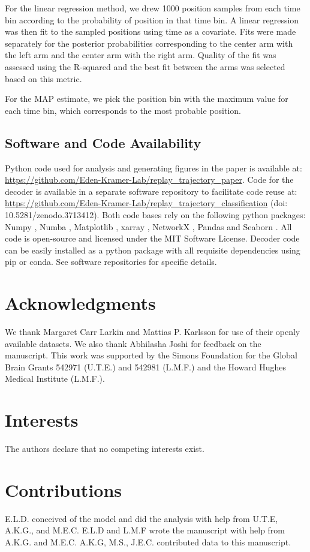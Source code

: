 \documentclass[9pt,lineno]{elife}
\begin{document}
For the linear regression method, we drew 1000 position samples from each time bin according to the probability of position in that time bin. A linear regression was then fit to the sampled positions using time as a covariate. Fits were made separately for the posterior probabilities corresponding to the center arm with the left arm and the center arm with the right arm. Quality of the fit was assessed using the R-squared and the best fit between the arms was selected based on this metric.

For the MAP estimate, we pick the position bin with the maximum value for each time bin, which corresponds to the most probable position.

\subsection*{Software and Code Availability}
Python code used for analysis and generating figures in the paper is available at: \url{https://github.com/Eden-Kramer-Lab/replay_trajectory_paper}. Code for the decoder is available in a separate software repository to facilitate code reuse at: \url{https://github.com/Eden-Kramer-Lab/replay_trajectory_classification} (doi: 10.5281/zenodo.3713412).
Both code bases rely on the following python packages: Numpy \citep{vanderWaltNumPyArrayStructure2011}, Numba \citep{LamNumbaLLVMbasedPython2015}, Matplotlib \citep{HunterMatplotlib2DGraphics2007}, xarray \citep{HoyerxarrayNDlabeled2017}, NetworkX \citep{HagbergExploringNetworkStructure2008}, Pandas \citep{McKinneyDataStructuresStatistical2010} and Seaborn \citep{Waskomseabornstatisticaldata2021}. All code is open-source and licensed under the MIT Software License. Decoder code can be easily installed as a python package with all requisite dependencies using pip or conda. See software repositories for specific details.

\section{Acknowledgments}
We thank Margaret Carr Larkin and Mattias P. Karlsson for use of their openly available datasets. We also thank Abhilasha Joshi for feedback on the manuscript. This work was supported by the Simons Foundation for the Global Brain Grants 542971 (U.T.E.) and 542981 (L.M.F.) and the Howard Hughes Medical Institute (L.M.F.).

\section{Interests}
The authors declare that no competing interests exist.

\section{Contributions}
E.L.D. conceived of the model and did the analysis with help from U.T.E, A.K.G., and M.E.C. E.L.D and L.M.F wrote the manuscript with help from A.K.G. and M.E.C. A.K.G, M.S., J.E.C. contributed data to this manuscript.


\end{document}
